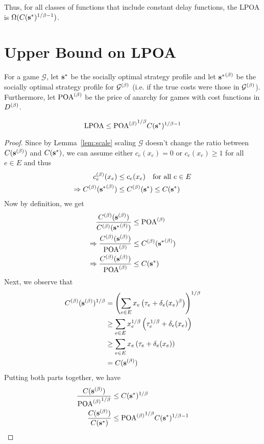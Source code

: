 \documentclass[twoside]{article}
\begin{document}
\begin{multicols}{2}
Thus, for all classes of functions that include constant delay functions, the
LPOA is $\Omega(C(\mathbf{s}^*)^{1/\beta-1})$.

\section{Upper Bound on LPOA} \label{sec:ub}
For a game $\mathcal{G}$, let $\mathbf{s}^*$ be the socially optimal strategy profile
and let ${\mathbf{s}^*}^{(\beta)}$ be the socially optimal strategy profile for
$\mathcal{G}^{(\beta)}$ (i.e. if the true costs were those in $\mathcal{G}^{(\beta)}$).
Furthermore, let $\text{POA}^{(\beta)}$ be the price of anarchy for games with cost functions in
$D^{(\beta)}$.
\begin{thm} \label{thm:lpoa}
  \[
    \text{LPOA} \le {\ensuremath{\text{POA}^{(\beta)}}}^{1/\beta} C(\mathbf{s}^*)^{1/\beta-1}
  \]
\end{thm}
\begin{proof}
  Since by Lemma~\ref{lem:scale} scaling $\mathcal{G}$ doesn't change the ratio
  between $C(\mathbf{s}^{(\beta)})$ and $C(\mathbf{s}^*)$, we can assume either $c_e(x_e) = 0$ or
  $c_e(x_e) \ge 1$ for all $e \in E$ and thus
  \begin{align*}
  c_e^{(\beta)}(x_e) &\le c_e(x_e) \quad \text{for all }e \in E \\
  \Rightarrow C^{(\beta)}({\mathbf{s}^*}^{(\beta)}) &\le C^{(\beta)}(\mathbf{s}^*) \le C(\mathbf{s}^*)
  \end{align*}
  Now by definition, we get 
  \begin{align*}
  \frac{C^{(\beta)}(\mathbf{s}^{(\beta)})}{C^{(\beta)}({\mathbf{s}^*}^{(\beta)})} &\le \text{POA}^{(\beta)} \\
  \Rightarrow \frac{C^{(\beta)}(\mathbf{s}^{(\beta)})}{\text{POA}^{(\beta)}} &\le C^{(\beta)}({\mathbf{s}^*}^{(\beta)}) \\
  \Rightarrow \frac{C^{(\beta)}(\mathbf{s}^{(\beta)})}{\text{POA}^{(\beta)}} &\le C(\mathbf{s}^*)
  \end{align*}
  Next, we observe that \begin{align*}
    C^{(\beta)}(\mathbf{s}^{(\beta)})^{1/\beta} &= \left(\sum_{e \in E} x_e\left(\tau_e + \delta_e(x_e)^\beta\right)\right)^{1/\beta}
    \\
    &\ge \sum_{e \in E} x_e^{1/\beta}\left(\tau_e^{1/\beta} + \delta_e(x_e)\right) \\
    &\ge \sum_{e \in E} x_e\left(\tau_e + \delta_e(x_e)\right) \\
    &= C(\mathbf{s}^{(\beta)})
  \end{align*}
  Putting both parts together, we have
  \begin{align*}
    \frac{C(\mathbf{s}^{(\beta)})}{{\text{POA}^{(\beta)}}^{1/\beta}} &\le C(\mathbf{s}^*)^{1/\beta} \\
    \frac{C(\mathbf{s}^{(\beta)})}{C(\mathbf{s}^*)} &\le {\ensuremath{\text{POA}^{(\beta)}}}^{1/\beta} C(\mathbf{s}^*)^{1/\beta-1}
  \end{align*}
\end{proof}



\end{multicols}
\end{document}
